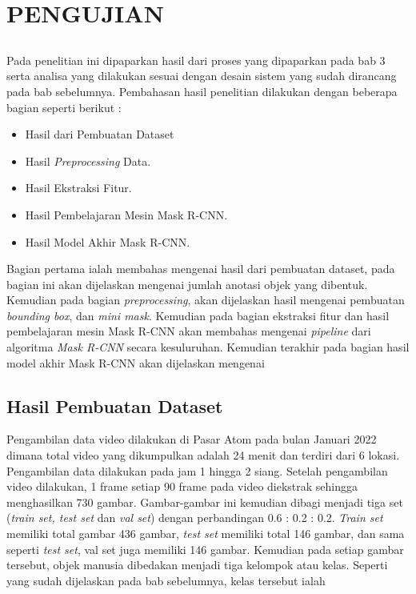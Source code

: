 \chapter{PENGUJIAN}
\label{sec:chap4_pengujian}
\vspace{1ex}

\section*{}
Pada penelitian ini dipaparkan hasil dari proses yang dipaparkan pada bab 3 serta analisa yang dilakukan sesuai 
dengan desain sistem yang sudah dirancang pada bab sebelumnya. Pembahasan hasil penelitian dilakukan
dengan beberapa bagian seperti berikut :

\begin{itemize}[nolistsep]
    \item Hasil dari Pembuatan Dataset
    \item Hasil \textit{Preprocessing} Data.
    \item Hasil Ekstraksi Fitur.
    \item Hasil Pembelajaran Mesin Mask R-CNN.
    \item Hasil Model Akhir Mask R-CNN.
\end{itemize}

Bagian pertama ialah membahas mengenai hasil dari pembuatan dataset, pada bagian ini akan dijelaskan mengenai
jumlah anotasi objek yang dibentuk. Kemudian pada bagian \textit{preprocessing}, akan dijelaskan hasil mengenai
pembuatan \textit{bounding box}, dan \textit{mini mask}. Kemudian pada bagian ekstraksi fitur dan hasil pembelajaran
mesin Mask R-CNN akan membahas mengenai \textit{pipeline} dari algoritma \textit{Mask R-CNN} secara kesuluruhan.
Kemudian terakhir pada bagian hasil model akhir Mask R-CNN akan dijelaskan mengenai 

\section{Hasil Pembuatan Dataset}
Pengambilan data video dilakukan di Pasar Atom pada bulan Januari 2022 dimana total video yang dikumpulkan adalah 24 menit
dan terdiri dari 6 lokasi. Pengambilan data dilakukan pada jam 1 hingga 2 siang. Setelah pengambilan video dilakukan,
1 frame setiap 90 frame pada video diekstrak sehingga menghasilkan 730 gambar. Gambar-gambar ini kemudian dibagi
menjadi tiga set (\textit{train set, test set} dan \textit{val set}) dengan perbandingan 0.6 : 0.2 : 0.2.
\textit{Train set} memiliki total gambar 436 gambar, \textit{test set} memiliki total 146 gambar, dan sama
seperti \textit{test set}, val set juga memiliki 146 gambar. Kemudian pada setiap gambar tersebut, objek manusia
dibedakan menjadi tiga kelompok atau kelas. Seperti yang sudah dijelaskan pada bab sebelumnya, kelas tersebut ialah

